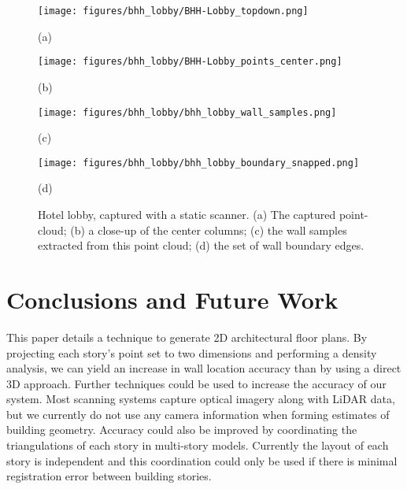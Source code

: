 \documentclass[10pt,twocolumn,letterpaper]{article}
\begin{document}
\begin{figure}[t]

\begin{minipage}[b]{0.45\linewidth}
  \centering
  \centerline{\texttt{[image: figures/bhh\_lobby/BHH-Lobby\_topdown.png]}}
  \centerline{(a)}
\end{minipage}
\hfill
\begin{minipage}[b]{0.45\linewidth}
  \centering
  \centerline{\texttt{[image: figures/bhh\_lobby/BHH-Lobby\_points\_center.png]}}
  \centerline{(b)}
\end{minipage}

\begin{minipage}[b]{0.45\linewidth}
  \centering
  \centerline{\texttt{[image: figures/bhh\_lobby/bhh\_lobby\_wall\_samples.png]}}
  \centerline{(c)}
\end{minipage}
\hfill
\begin{minipage}[b]{0.45\linewidth}
  \centering
  \centerline{\texttt{[image: figures/bhh\_lobby/bhh\_lobby\_boundary\_snapped.png]}}
  \centerline{(d)}
\end{minipage}

\caption{Hotel lobby, captured with a static scanner.  (a) The captured point-cloud; (b) a close-up of the center columns; (c) the wall samples extracted from this point cloud; (d) the set of wall boundary edges.}
\label{fig:bhh_lobby_results}

\end{figure}

\section{Conclusions and Future Work}
\label{sec:conclusion}

This paper details a technique to generate 2D architectural floor plans.  By projecting each story's point set to two dimensions and performing a density analysis, we can yield an increase in wall location accuracy than by using a direct 3D approach.  Further techniques could be used to increase the accuracy of our system.  Most scanning systems capture optical imagery along with LiDAR data, but we currently do not use any camera information when forming estimates of building geometry.  Accuracy could also be improved by coordinating the triangulations of each story in multi-story models.  Currently the layout of each story is independent and this coordination could only be used if there is minimal registration error between building stories.


{\small


}
\end{document}
